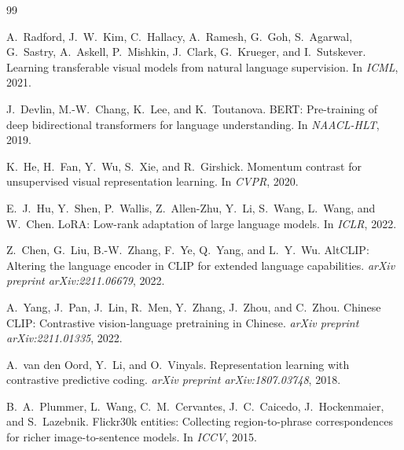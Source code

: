 \documentclass[10pt,leqno]{amsart}
\begin{document}

\begin{thebibliography}{99}

A.~Radford, J.~W.~Kim, C.~Hallacy, A.~Ramesh, G.~Goh, S.~Agarwal, G.~Sastry, A.~Askell, P.~Mishkin, J.~Clark, G.~Krueger, and I.~Sutskever.
\newblock Learning transferable visual models from natural language supervision.
\newblock In \textit{ICML}, 2021.

J.~Devlin, M.-W.~Chang, K.~Lee, and K.~Toutanova.
\newblock BERT: Pre-training of deep bidirectional transformers for language understanding.
\newblock In \textit{NAACL-HLT}, 2019.

K.~He, H.~Fan, Y.~Wu, S.~Xie, and R.~Girshick.
\newblock Momentum contrast for unsupervised visual representation learning.
\newblock In \textit{CVPR}, 2020.

E.~J.~Hu, Y.~Shen, P.~Wallis, Z.~Allen-Zhu, Y.~Li, S.~Wang, L.~Wang, and W.~Chen.
\newblock LoRA: Low-rank adaptation of large language models.
\newblock In \textit{ICLR}, 2022.

Z.~Chen, G.~Liu, B.-W.~Zhang, F.~Ye, Q.~Yang, and L.~Y.~Wu.
\newblock AltCLIP: Altering the language encoder in CLIP for extended language capabilities.
\newblock \textit{arXiv preprint arXiv:2211.06679}, 2022.

A.~Yang, J.~Pan, J.~Lin, R.~Men, Y.~Zhang, J.~Zhou, and C.~Zhou.
\newblock Chinese CLIP: Contrastive vision-language pretraining in Chinese.
\newblock \textit{arXiv preprint arXiv:2211.01335}, 2022.

A.~van den Oord, Y.~Li, and O.~Vinyals.
\newblock Representation learning with contrastive predictive coding.
\newblock \textit{arXiv preprint arXiv:1807.03748}, 2018.

B.~A.~Plummer, L.~Wang, C.~M.~Cervantes, J.~C.~Caicedo, J.~Hockenmaier, and S.~Lazebnik.
\newblock Flickr30k entities: Collecting region-to-phrase correspondences for richer image-to-sentence models.
\newblock In \textit{ICCV}, 2015.


\end{thebibliography}
\end{document}
